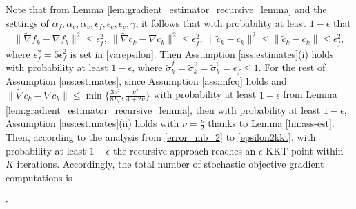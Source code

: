 \documentclass[11pt]{article}
\newenvironment{proof}{{\noindent\it Proof.}\quad}{\hfill $\square$\par}
\def\red#1{\textcolor{red}{#1}}
\newcommand{\be}{\begin{equation}}
\newcommand{\ee}{\end{equation}}
\begin{document}
\begin{proof}
    Note that from Lemma \ref{lem:gradient_estimator_recursive_lemma} and the settings of \(\alpha_f,\alpha_c,\alpha_v,\bar \epsilon_f, \bar \epsilon_c, \bar \epsilon_v, \gamma\), it follows that  with probability at least \(1-\epsilon\) that
    \be\begin{aligned}\label{error_rm_2}
        \|\tilde \nabla f_k - \nabla f_k\|^2 \leq \epsilon_f^2,~
        \|\tilde \nabla c_k - \nabla c_k\|^2 \leq \epsilon_f^2,~\|\tilde c_k - c_k\|^2 \leq \|\tilde c_k - c_k\| \leq \epsilon_f^2,
    \end{aligned}\ee
    where \(\epsilon_f^2 = 5\bar \epsilon_f^2\) is set in \eqref{varepsilon}.
    Then Assumption \ref{ass:estimates}(i) holds with probability at least $1-\epsilon$, where $\tilde \sigma_k^f =  \tilde \sigma_k^v = \tilde \sigma_k^v =\epsilon_f \leq 1$.  
    For the rest of Assumption \ref{ass:estimates}, since Assumption \ref{ass:mfcq} holds and \(\|\tilde \nabla c_k - \nabla c_k\| \leq \min\{\frac{3\nu^2}{8L_c},\frac{\nu^2}{4+2\nu}\}\) with probability at least \(1-\epsilon\) from Lemma \ref{lem:gradient_estimator_recursive_lemma}, then with probability at least \(1-\epsilon\), Assumption \ref{ass:estimates}(ii) holds with \(\tilde \nu = \frac{\nu}{2}\) thanks to Lemma \ref{lm:ass-est}. 
    Then, according to the analysis from \eqref{error_mb_2} to \eqref{epsilon2kkt},  with probability at least \(1-\epsilon\) the recursive approach reaches an \(\epsilon\)-KKT point within $K$ 
    iterations. Accordingly,  the total number  of stochastic objective  gradient computations is 

\end{proof}
\end{document}
